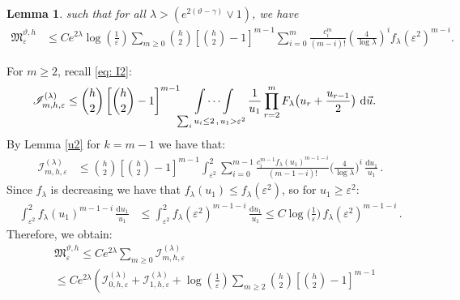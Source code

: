 \documentclass[a4paper,reqno,11pt]{amsart}
\makeatletter
\renewenvironment{proof}[1][\proofname]{\par
\pushQED{\qed}%
\normalfont \topsep4\p@\@plus4\p@\relax
\trivlist
\item[\hskip\labelsep
\bfseries
#1\@addpunct{.}]\ignorespaces
}{%
\popQED\endtrivlist\@endpefalse
}
\numberwithin{equation}{section}
\theoremstyle{mytheorem}
\newtheorem{lemma}[theorem]{Lemma}
\newcommand{\gl}{\lambda}
\renewcommand{\epsilon}{\varepsilon}
\renewcommand{\theta}{\vartheta}
\newcommand\ra{\left(}
\newcommand\rb{\right)}
\newcommand\mI{\mathscr{I}}
\newcommand\dd{\mathrm{d}}
\newcommand{\f}{\frac}
\makeatother
\begin{document}
{\begin{lemma}
 such that for all $\lambda> \ra e^{2(\theta-\gamma)} \vee 1 \rb$, we have
\begin{equation}\label{eq: I3}
\begin{split}
    \mathfrak{M}_\epsilon^{\theta,h}
    & \le C e^{2\gl} \log(\f{1}{\epsilon})
    \sum_{m\ge 0} {h \choose 2} \left[ {h\choose 2} -1 \right]^{m-1}
    \sum_{i=0}^{m}\frac{c_i^{m}}{(m-i)!}
    \ra
    \frac{4}{\log\gl}
    \rb^i
    f_\gl(\epsilon^2)^{m-i}.
\end{split}
\end{equation}
\end{lemma}
\begin{proof}
    For $m\ge 2$, recall \eqref{eq: I2}:
    \begin{align*}
        \mI^{(\lambda)}_{m,h,\epsilon} & \le {h \choose 2} \left[ {h\choose 2} -1 \right]^{m-1}
        \idotsint\limits_{\sum_i u_i \le 2\,,\, u_1>\epsilon^2}
        \frac{1}{u_1}
        \prod^m_{r=2}F_\gl \big(u_r+ \frac{u_{r-1}}{2} \big) \,\, \dd\vec u .
    \end{align*}
    By Lemma \ref{u2} for $k=m-1$ we have that:
    \begin{equation}\label{before u1}
    \begin{split}
    \mI^{(\lambda)}_{m,h,\epsilon}
    & \le 
    {h \choose 2} \left[ {h\choose 2} -1 \right]^{m-1}
    \int^2_{\epsilon^2}  
    \sum^{m-1}_{i=0}
    \frac{c_i^{m-1} f_\gl(u_1)^{m-1-i}}{(m-1-i)!}
    \Big(
    \frac{4}{\log\gl}
    \Big)^i \, \frac{\dd u_1}{u_1}\, .
    \end{split}
    \end{equation}
    Since $f_\lambda$ is decreasing we have that $f_\lambda(u_1)\leq f_\lambda(\epsilon^2)$, so for 
    $u_1\geq \epsilon^2$:
    \begin{align}\label{F(u1)}
        \int^2_{\epsilon^2} 
        f_\gl(u_1)^{m-1-i} \, \frac{\dd u_1}{u_1}
        & \le 
        \int^2_{\epsilon^2}
        f_\gl(\epsilon^2)^{m-1-i} \, \frac{\dd u_1}{u_1} 
        \le  C \log \Big( \f{1}{\epsilon} \Big) \, f_\gl(\epsilon^2)^{m-1-i} \,.
    \end{align}
    Therefore, we obtain:
    \begin{align*}
        &\mathfrak{M}_\epsilon^{\theta,h}  \le C e^{2\gl} \sum_{m\ge 0} \mI^{(\lambda)}_{m,h,\epsilon}\\
        & \le C e^{2\gl} \ra \mI^{(\lambda)}_{0,h,\epsilon} + \mI^{(\lambda)}_{1,h,\epsilon} + \log\ra \f{1}{\epsilon} \rb 
        \sum_{m\ge 2} 
        {h \choose 2} \left[ {h\choose 2} -1 \right]^{m-1} 

\end{align*}
\end{proof}}
\end{document}
